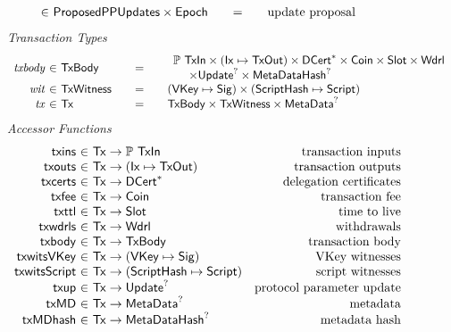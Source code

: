 \begin{figure*}[htb]
\begin{equation*}
\begin{array}{r@{~\in~}l@{\qquad=\qquad}lr}
      & \ProposedPPUpdates \times \Epoch
      & \text{update proposal}
    \end{array}
  \end{equation*}
  \emph{Transaction Types}
  \begin{equation*}
    \begin{array}{r@{~\in~}l@{\qquad=\qquad}l}
      \var{txbody}
      & \TxBody
      & \begin{array}{l}
        \powerset{\TxIn} \times (\Ix \mapsto \TxOut) \times \seqof{\DCert}
        \times \Coin \times \Slot \times \Wdrl
        \\ ~~~~\times \Update^? \times \MetaDataHash^?
        \end{array}
      \\
      \var{wit} & \TxWitness & (\VKey \mapsto \Sig) \times (\HashScr \mapsto \Script)
      \\
      \var{tx}
      & \Tx
      & \TxBody \times \TxWitness \times \MetaData^?
    \end{array}
  \end{equation*}
  \emph{Accessor Functions}
  \begin{equation*}
    \begin{array}{r@{~\in~}lr}
      \fun{txins} & \Tx \to \powerset{\TxIn} & \text{transaction inputs} \\
      \fun{txouts} & \Tx \to (\Ix \mapsto \TxOut) & \text{transaction outputs} \\
      \fun{txcerts} & \Tx \to \seqof{\DCert} & \text{delegation certificates} \\
      \fun{txfee} & \Tx \to \Coin & \text{transaction fee} \\
      \fun{txttl} & \Tx \to \Slot & \text{time to live} \\
      \fun{txwdrls} & \Tx \to \Wdrl & \text{withdrawals} \\
      \fun{txbody} & \Tx \to \TxBody & \text{transaction body}\\
      \fun{txwitsVKey} & \Tx \to (\VKey \mapsto \Sig) & \text{VKey witnesses} \\
      \fun{txwitsScript} & \Tx \to (\HashScr \mapsto \Script) & \text{script witnesses}\\
      \fun{txup} & \Tx \to \Update^? & \text{protocol parameter update}\\
      \fun{txMD} & \Tx \to \MetaData^? & \text{metadata}\\
      \fun{txMDhash} & \Tx \to \MetaDataHash^? & \text{metadata hash}\\

\end{array}
\end{equation*}
\end{figure*}
